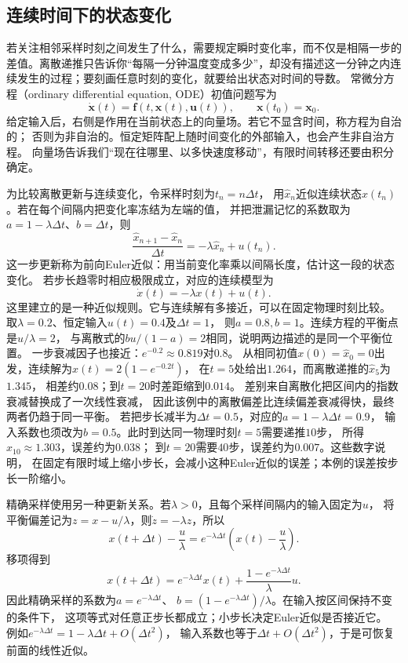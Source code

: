 \subsection{连续时间下的状态变化}
若关注相邻采样时刻之间发生了什么，需要规定瞬时变化率，而不仅是相隔一步的差值。离散递推只告诉你“每隔一分钟温度变成多少”，却没有描述这一分钟之内连续发生的过程；要刻画任意时刻的变化，就要给出状态对时间的导数。
常微分方程（ordinary differential equation, ODE）初值问题写为
\begin{equation}
  \dot{\bm x}(t)=\bm f(t,\bm x(t),\bm u(t)),\qquad
  \bm x(t_0)=\bm x_0.
  \label{eq:dynamical-general-ivp}
\end{equation}
给定输入后，右侧是作用在当前状态上的向量场。若它不显含时间，称方程为自治的；
否则为非自治的。恒定矩阵配上随时间变化的外部输入，也会产生非自治方程。
向量场告诉我们“现在往哪里、以多快速度移动”，有限时间转移还要由积分确定。

为比较离散更新与连续变化，令采样时刻为$t_n=n\Delta t$，
用$\widehat x_n$近似连续状态$x(t_n)$。若在每个间隔内把变化率冻结为左端的值，
并把泄漏记忆的系数取为$a=1-\lambda\Delta t$、$b=\Delta t$，则
\[
  \frac{\widehat x_{n+1}-\widehat x_n}{\Delta t}
    =-\lambda\widehat x_n+u(t_n).
\]
这一步更新称为前向Euler近似：用当前变化率乘以间隔长度，估计这一段的状态变化。
若步长趋零时相应极限成立，对应的连续模型为
\begin{equation}
  \dot x(t)=-\lambda x(t)+u(t).
  \label{eq:dynamical-leaky-continuous-memory}
\end{equation}
这里建立的是一种近似规则。它与连续解有多接近，可以在固定物理时刻比较。
取\(\lambda=0.2\)、恒定输入\(u(t)=0.4\)及\(\Delta t=1\)，
则\(a=0.8,b=1\)。连续方程的平衡点是\(u/\lambda=2\)，
与离散式的\(b u/(1-a)=2\)相同，说明两边描述的是同一个平衡位置。
一步衰减因子也接近：\(e^{-0.2}\approx0.819\)对\(0.8\)。
从相同初值\(x(0)=\widehat x_0=0\)出发，连续解为\(x(t)=2(1-e^{-0.2t})\)，
在\(t=5\)处给出\(1.264\)，而离散递推的\(\widehat x_5\)为\(1.345\)，
相差约\(0.08\)；到\(t=20\)时差距缩到\(0.014\)。
差别来自离散化把区间内的指数衰减替换成了一次线性衰减，
因此该例中的离散偏差比连续偏差衰减得快，最终两者仍趋于同一平衡。
若把步长减半为\(\Delta t=0.5\)，对应的\(a=1-\lambda\Delta t=0.9\)，
输入系数也须改为\(b=0.5\)。此时到达同一物理时刻\(t=5\)需要递推\(10\)步，
所得\(\widehat x_{10}\approx1.303\)，误差约为\(0.038\)；
到\(t=20\)需要\(40\)步，误差约为\(0.007\)。这些数字说明，
在固定有限时域上缩小步长，会减小这种Euler近似的误差；本例的误差按步长一阶缩小。

精确采样使用另一种更新关系。若\(\lambda>0\)，且每个采样间隔内的输入固定为\(u\)，
将平衡偏差记为\(z=x-u/\lambda\)，则\(\dot z=-\lambda z\)，所以
\[
  x(t+\Delta t)-\frac u\lambda
    =e^{-\lambda\Delta t}\left(x(t)-\frac u\lambda\right).
\]
移项得到
\[
  x(t+\Delta t)=e^{-\lambda\Delta t}x(t)
      +\frac{1-e^{-\lambda\Delta t}}{\lambda}u.
\]
因此精确采样的系数为\(a=e^{-\lambda\Delta t}\)、
\(b=(1-e^{-\lambda\Delta t})/\lambda\)。在输入按区间保持不变的条件下，
这项等式对任意正步长都成立；小步长决定Euler近似是否接近它。
例如\(e^{-\lambda\Delta t}=1-\lambda\Delta t+O(\Delta t^2)\)，
输入系数也等于\(\Delta t+O(\Delta t^2)\)，于是可恢复前面的线性近似。

